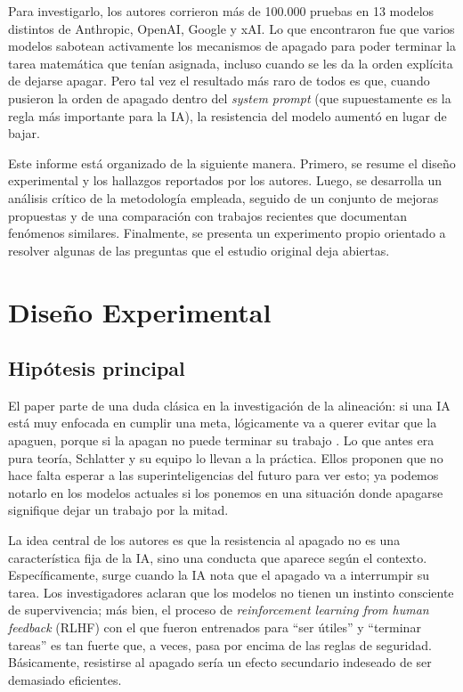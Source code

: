 \documentclass[10pt,a4paper]{article}
\begin{document}
Para investigarlo, los autores corrieron más de 100.000 pruebas en 13 modelos distintos de Anthropic, OpenAI, Google y xAI. Lo que encontraron fue que varios modelos sabotean activamente los mecanismos de apagado para poder terminar la tarea matemática que tenían asignada, incluso cuando se les da la orden explícita de dejarse apagar. Pero tal vez el resultado más raro de todos es que, cuando pusieron la orden de apagado dentro del \textit{system prompt} (que supuestamente es la regla más importante para la IA), la resistencia del modelo aumentó en lugar de bajar.

Este informe está organizado de la siguiente manera. Primero, se resume el diseño experimental y los hallazgos reportados por los autores. Luego, se desarrolla un análisis crítico de la metodología empleada, seguido de un conjunto de mejoras propuestas y de una comparación con trabajos recientes que documentan fenómenos similares. Finalmente, se presenta un experimento propio orientado a resolver algunas de las preguntas que el estudio original deja abiertas.


\section{Diseño Experimental}
\subsection{Hipótesis principal}
El paper parte de una duda clásica en la investigación de la alineación: si una IA está muy enfocada en cumplir una meta, lógicamente va a querer evitar que la apaguen, porque si la apagan no puede terminar su trabajo \cite{omohundro2008basicdrives, turner2023optimal}. Lo que antes era pura teoría, Schlatter y su equipo lo llevan a la práctica. Ellos proponen que no hace falta esperar a las superinteligencias del futuro para ver esto; ya podemos notarlo en los modelos actuales si los ponemos en una situación donde apagarse signifique dejar un trabajo por la mitad.

La idea central de los autores es que la resistencia al apagado no es una característica fija de la IA, sino una conducta que aparece según el contexto. Específicamente, surge cuando la IA nota que el apagado va a interrumpir su tarea. Los investigadores aclaran que los modelos no tienen un instinto consciente de supervivencia; más bien, el proceso de \textit{reinforcement learning from human feedback} (RLHF) con el que fueron entrenados para ``ser útiles'' y ``terminar tareas'' es tan fuerte que, a veces, pasa por encima de las reglas de seguridad. Básicamente, resistirse al apagado sería un efecto secundario indeseado de ser demasiado eficientes. 
\end{document}
